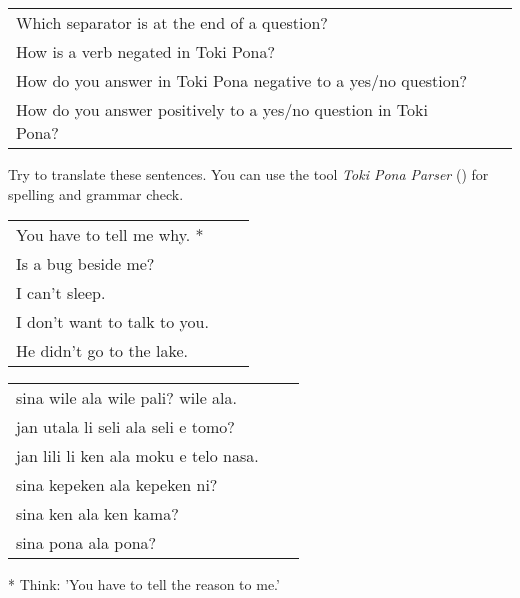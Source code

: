 \begin{supertabular}{p{5,5cm}|ll}
    Which separator is at the end of a question?                    &  & \\
    How is a verb negated in Toki Pona?                             &  & \\
    How do you answer in Toki Pona negative to a yes/no question?   &  & \\
    How do you answer positively to a yes/no question in Toki Pona? &  & \\
\end{supertabular}

Try to translate these sentences.
You can use the tool \textit{Toki Pona Parser} (\cite{www:rowa:02}) for spelling and grammar check.

\begin{supertabular}{p{5,5cm}|ll}
    You have to tell me why. *   &  & \\
    Is a bug beside me?          &  & \\
    I can't sleep.               &  & \\
    I don't want to talk to you. &  & \\
    He didn't go to the lake.    &  & \\
\end{supertabular}

\begin{supertabular}{p{5,5cm}|ll}
    sina wile ala wile pali? wile ala.    &  & \\
    jan utala li seli ala seli e tomo?    &  & \\
    jan lili li ken ala moku e telo nasa. &  & \\
    sina kepeken ala kepeken ni?          &  & \\
    sina ken ala ken kama?                &  & \\
    sina pona ala pona?                   &  & \\
\end{supertabular}

* Think: 'You have to tell the reason to me.'